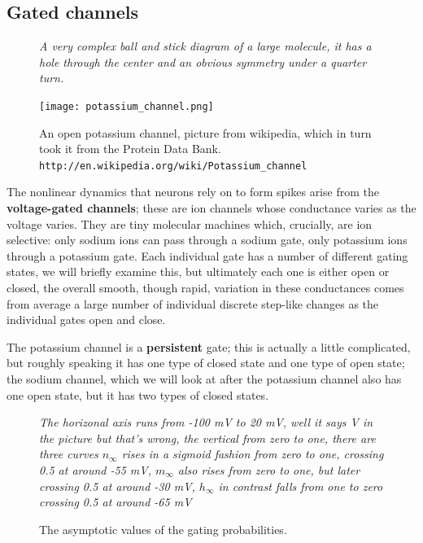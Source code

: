 \documentclass[12pt]{article}
\begin{document}
\subsection*{Gated channels}

\begin{figure}
             {\textsl{A very complex ball and stick diagram of a large molecule, it has a hole through the center and an obvious symmetry under a quarter turn.}}
             {
  \begin{center}
\texttt{[image: potassium\_channel.png]}
  \end{center}
  }
\caption{An open potassium channel, picture from  wikipedia, which in turn took it from the Protein Data Bank. \texttt{http://en.wikipedia.org/wiki/Potassium\_channel}}
\end{figure}

The nonlinear dynamics that neurons rely on to form spikes arise from
the \textbf{voltage-gated channels}; these are ion channels whose
conductance varies as the voltage varies. They are tiny molecular
machines which, crucially, are ion selective: only sodium ions can
pass through a sodium gate, only potassium ions through a potassium
gate. Each individual gate has a number of different gating states, we
will briefly examine this, but ultimately each one is either open or
closed, the overall smooth, though rapid, variation in these
conductances comes from average a large number of individual discrete
step-like changes as the individual gates open and close.

The potassium channel is a \textbf{persistent} gate; this is actually
a little complicated, but roughly speaking it has one type of closed
state and one type of open state; the sodium channel, which we will
look at after the potassium channel also has one open state, but it
has two types of closed states. 

\begin{figure}
  {\textsl{The horizonal axis runs from -100 mV to 20 mV, well it says V in the picture but that's wrong, the vertical from zero to one, there are three curves $n_\infty$ rises in a sigmoid fashion from zero to one, crossing 0.5 at around -55 mV, $m_\infty$ also rises from zero to one, but later crossing 0.5 at around -30 mV, $h_\infty$ in contrast falls from one to zero crossing 0.5 at around -65 mV }}
{\begin{center}

\end{center}}
\caption{The asymptotic values of the gating probabilities.\label{fig:asymp_vals}}
\end{figure}
\end{document}
